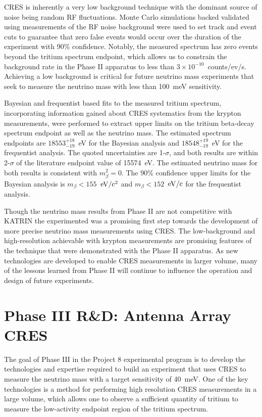 CRES is inherently a very low background technique with the dominant source of noise being random RF fluctuations. Monte Carlo simulations backed validated using measurements of the RF noise background were used to set track and event cuts to guarantee that zero false events would occur over the duration of the experiment with 90\% confidence. Notably, the measured spectrum has zero events beyond the tritium spectrum endpoint, which allows us to constrain the background rate in the Phase II apparatus to less than $3\times10^{-10}$~counts/ev/s. Achieving a low background is critical for future neutrino mass experiments that seek to measure the neutrino mass with less than 100~meV sensitivity.

Bayesian and frequentist based fits to the measured tritium spectrum, incorporating information gained about CRES systematics from the krypton measurements, were performed to extract upper limits on the tritium beta-decay spectrum endpoint as well as the neutrino mass. The estimated spectrum endpoints are $18553^{+18}_{-19}$~eV for the Bayesian analysis and $18548^{+19}_{-19}$~eV for the frequentist analysis. The quoted uncertainties are 1-$\sigma$, and both results are within 2-$\sigma$ of the literature endpoint value of 15574~eV. The estimated neutrino mass for both results is consistent with $m_\beta^2=0$. The 90\% confidence upper limits for the Bayesian analysis is $m_\beta < 155$~$\rm{eV}/\rm{c}^2$ and $m_\beta < 152$~$\rm{eV}/\rm{c}$ for the frequentist analysis.

Though the neutrino mass results from Phase II are not competitive with KATRIN the experimented was a promising first step towards the development of more precise neutrino mass measurements using CRES. The low-background and high-resolution achievable with krypton measurements are promising features of the technique that were demonstrated with the Phase II apparatus. As new technologies are developed to enable CRES measurements in larger volume, many of the lessons learned from Phase II will continue to influence the operation and design of future experiments.

\section{Phase III R\&D: Antenna Array CRES}
\label{sec:chap3-phaseIII-antenna-arrays}

The goal of Phase III in the Project 8 experimental program is to develop the technologies and expertise required to build an experiment that uses CRES to measure the neutrino mass with a target sensitivity of 40~meV. One of the key technologies is a method for performing high resolution CRES measurements in a large volume, which allows one to observe a sufficient quantity of tritium to measure the low-activity endpoint region of the tritium spectrum. 

